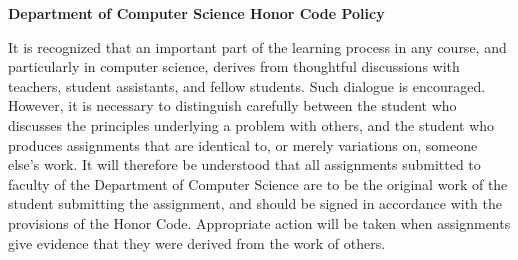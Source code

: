 \documentclass[11pt]{article} %
\begin{document}
\begin{center} \textbf{ Department of Computer Science Honor Code Policy } \end{center}
\vspace*{-.1in}
It is recognized that an important part of the learning process in any course, and particularly in computer science, derives from thoughtful discussions with teachers, student
assistants, and fellow students. Such dialogue is encouraged. However, it is necessary
to distinguish carefully between the student who discusses the principles underlying a
problem with others, and the student who produces assignments that are identical to,
or merely variations on, someone else's work. It will therefore be understood that all
assignments submitted to faculty of the Department of Computer Science are to be
the original work of the student submitting the assignment, and should be signed in
accordance with the provisions of the Honor Code.  Appropriate action will be taken when assignments give evidence that they were derived from the work of others.
\end{document}
